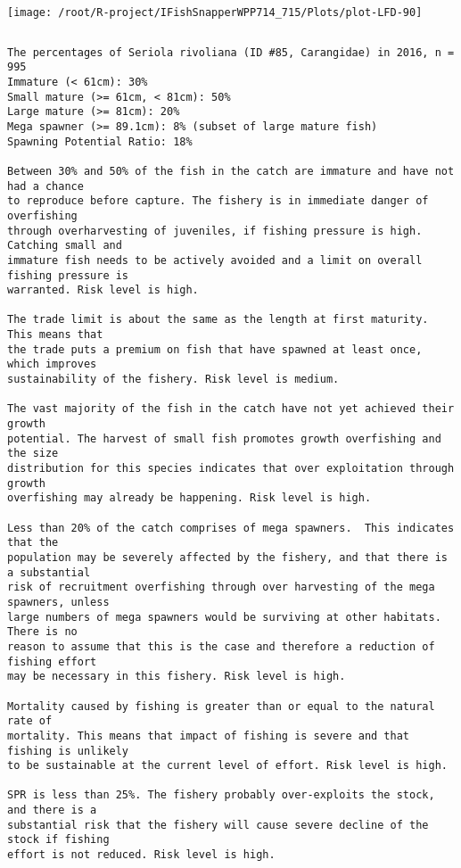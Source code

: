 \documentclass{report}\usepackage[]{graphicx}\usepackage[]{color}
\makeatletter
\def\maxwidth{ %
  \ifdim\Gin@nat@width>\linewidth
    \linewidth
  \else
    \Gin@nat@width
  \fi
}
\newenvironment{kframe}{%
 \def\at@end@of@kframe{}%
 \ifinner\ifhmode%
  \def\at@end@of@kframe{\end{minipage}}%
  \begin{minipage}{\columnwidth}%
 \fi\fi%
 \def\FrameCommand##1{\hskip\@totalleftmargin \hskip-\fboxsep
 \colorbox{shadecolor}{##1}\hskip-\fboxsep
     \hskip-\linewidth \hskip-\@totalleftmargin \hskip\columnwidth}%
 \MakeFramed {\advance\hsize-\width
   \@totalleftmargin\z@ \linewidth\hsize
   \@setminipage}}%
 {\par\unskip\endMakeFramed%
 \at@end@of@kframe}
\newenvironment{knitrout}{}{} %
\makeatother
\begin{document}
\begin{knitrout}
\texttt{[image: /root/R-project/IFishSnapperWPP714\_715/Plots/plot-LFD-90]} 
\begin{kframe}\begin{verbatim}
\end{verbatim}
\end{kframe}
\clearpage
\newpage
\begin{kframe}\begin{verbatim}The percentages of Seriola rivoliana (ID #85, Carangidae) in 2016, n = 995
Immature (< 61cm): 30%
Small mature (>= 61cm, < 81cm): 50%
Large mature (>= 81cm): 20%
Mega spawner (>= 89.1cm): 8% (subset of large mature fish)
Spawning Potential Ratio: 18%
 
Between 30% and 50% of the fish in the catch are immature and have not had a chance
to reproduce before capture. The fishery is in immediate danger of overfishing
through overharvesting of juveniles, if fishing pressure is high.  Catching small and
immature fish needs to be actively avoided and a limit on overall fishing pressure is
warranted. Risk level is high.

The trade limit is about the same as the length at first maturity.  This means that
the trade puts a premium on fish that have spawned at least once, which improves
sustainability of the fishery. Risk level is medium.

The vast majority of the fish in the catch have not yet achieved their growth
potential. The harvest of small fish promotes growth overfishing and the size
distribution for this species indicates that over exploitation through growth
overfishing may already be happening. Risk level is high.

Less than 20% of the catch comprises of mega spawners.  This indicates that the
population may be severely affected by the fishery, and that there is a substantial
risk of recruitment overfishing through over harvesting of the mega spawners, unless
large numbers of mega spawners would be surviving at other habitats. There is no
reason to assume that this is the case and therefore a reduction of fishing effort
may be necessary in this fishery. Risk level is high.
 
Mortality caused by fishing is greater than or equal to the natural rate of
mortality. This means that impact of fishing is severe and that fishing is unlikely
to be sustainable at the current level of effort. Risk level is high.
 
SPR is less than 25%. The fishery probably over-exploits the stock, and there is a
substantial risk that the fishery will cause severe decline of the stock if fishing
effort is not reduced. Risk level is high.
 

\end{verbatim}
\end{kframe}
\end{knitrout}
\end{document}

